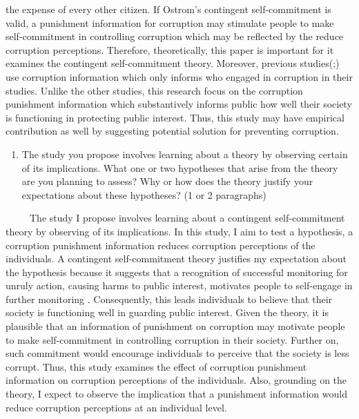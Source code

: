 \documentclass[
  11pt,
]{article}
\providecommand{\tightlist}{%
  \setlength{\itemsep}{0pt}\setlength{\parskip}{0pt}}
\begin{document}
the expense of every other citizen. If Ostrom's contingent
self-commitment is valid, a punishment information for corruption may
stimulate people to make self-commitment in controlling corruption which
may be reflected by the reduce corruption perceptions. Therefore,
theoretically, this paper is important for it examines the contingent
self-commitment theory. Moreover, previous
studies(\textcite{winters_lacking_2013};\textcite{boas_norms_2019}) use
corruption information which only informs who engaged in corruption in
their studies. Unlike the other studies, this research focus on the
corruption punishment information which substantively informs public how
well their society is functioning in protecting public interest. Thus,
this study may have empirical contribution as well by suggesting
potential solution for preventing corruption.

\begin{enumerate}
\def\labelenumi{\arabic{enumi}.}
\setcounter{enumi}{1}
\tightlist
\item
  The study you propose involves learning about a theory by observing
  certain of its implications. What one or two hypotheses that arise
  from the theory are you planning to assess? Why or how does the theory
  justify your expectations about these hypotheses? (1 or 2 paragraphs)
\end{enumerate}

~~~~~The study I propose involves learning about a contingent
self-commitment theory by observing of its implications. In this study,
I aim to test a hypothesis, a corruption punishment information reduces
corruption perceptions of the individuals. A contingent self-commitment
theory justifies my expectation about the hypothesis because it suggests
that a recognition of successful monitoring for unruly action, causing
harms to public interest, motivates people to self-engage in further
monitoring \textcite{ostrom_governing_1990}. Consequently, this leads
individuals to believe that their society is functioning well in
guarding public interest. Given the theory, it is plausible that an
information of punishment on corruption may motivate people to make
self-commitment in controlling corruption in their society. Further on,
such commitment would encourage individuals to perceive that the society
is less corrupt. Thus, this study examines the effect of corruption
punishment information on corruption perceptions of the individuals.
Also, grounding on the theory, I expect to observe the implication that
a punishment information would reduce corruption perceptions at an
individual level.
\end{document}
